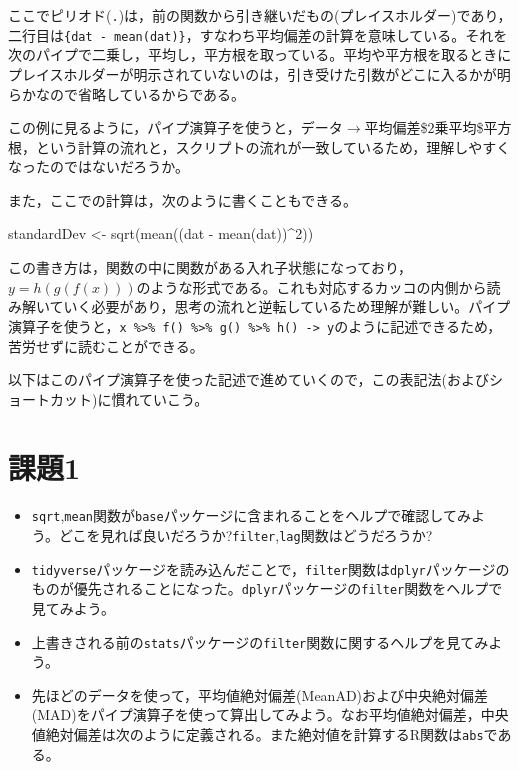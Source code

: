 \documentclass[
  a4paper,
]{ltjsbook}
\newenvironment{Shaded}{\begin{snugshade}}{\end{snugshade}}
\newcommand{\DecValTok}[1]{\textcolor[rgb]{0.68,0.00,0.00}{#1}}
\newcommand{\FunctionTok}[1]{\textcolor[rgb]{0.28,0.35,0.67}{#1}}
\newcommand{\NormalTok}[1]{\textcolor[rgb]{0.00,0.23,0.31}{#1}}
\newcommand{\OtherTok}[1]{\textcolor[rgb]{0.00,0.23,0.31}{#1}}
\newcommand{\SpecialCharTok}[1]{\textcolor[rgb]{0.37,0.37,0.37}{#1}}
\providecommand{\tightlist}{%
  \setlength{\itemsep}{0pt}\setlength{\parskip}{0pt}}\usepackage{longtable,booktabs,array}
\begin{document}
ここでピリオド(\texttt{.})は，前の関数から引き継いだもの(プレイスホルダー)であり，二行目は\texttt{\{dat\ -\ mean(dat)\}}，すなわち平均偏差の計算を意味している。それを次のパイプで二乗し，平均し，平方根を取っている。平均や平方根を取るときにプレイスホルダーが明示されていないのは，引き受けた引数がどこに入るかが明らかなので省略しているからである。

この例に見るように，パイプ演算子を使うと，データ\(\to\)平均偏差\$\to\(2乗\)\to\(平均\)\to\$平方根，という計算の流れと，スクリプトの流れが一致しているため，理解しやすくなったのではないだろうか。

また，ここでの計算は，次のように書くこともできる。

\begin{Shaded}
\begin{Highlighting}[]
\NormalTok{standardDev }\OtherTok{\textless{}{-}} \FunctionTok{sqrt}\NormalTok{(}\FunctionTok{mean}\NormalTok{((dat }\SpecialCharTok{{-}} \FunctionTok{mean}\NormalTok{(dat))}\SpecialCharTok{\^{}}\DecValTok{2}\NormalTok{))}
\end{Highlighting}
\end{Shaded}

この書き方は，関数の中に関数がある入れ子状態になっており，\(y = h(g(f(x)))\)のような形式である。これも対応するカッコの内側から読み解いていく必要があり，思考の流れと逆転しているため理解が難しい。パイプ演算子を使うと，\texttt{x\ \%\textgreater{}\%\ f()\ \%\textgreater{}\%\ g()\ \%\textgreater{}\%\ h()\ -\textgreater{}\ y}のように記述できるため，苦労せずに読むことができる。

以下はこのパイプ演算子を使った記述で進めていくので，この表記法(およびショートカット)に慣れていこう。

\section{課題1}\label{ux8ab2ux984c1}

\begin{itemize}
\tightlist
\item
  \texttt{sqrt},\texttt{mean}関数が\texttt{base}パッケージに含まれることをヘルプで確認してみよう。どこを見れば良いだろうか?\texttt{filter},\texttt{lag}関数はどうだろうか?
\item
  \texttt{tidyverse}パッケージを読み込んだことで，\texttt{filter}関数は\texttt{dplyr}パッケージのものが優先されることになった。\texttt{dplyr}パッケージの\texttt{filter}関数をヘルプで見てみよう。
\item
  上書きされる前の\texttt{stats}パッケージの\texttt{filter}関数に関するヘルプを見てみよう。
\item
  先ほどのデータを使って，平均値絶対偏差(MeanAD)および中央絶対偏差(MAD)をパイプ演算子を使って算出してみよう。なお平均値絶対偏差，中央値絶対偏差は次のように定義される。また絶対値を計算するR関数は\texttt{abs}である。
\end{itemize}
\end{document}
